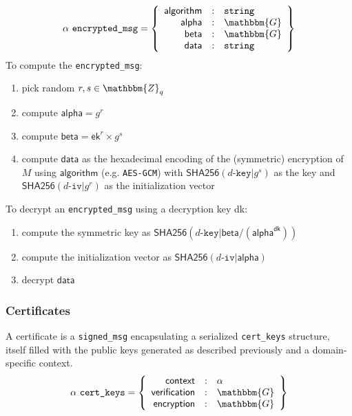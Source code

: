 \documentclass[a4paper]{article}
\newcommand{\G}{\mathbbm{G}}
\newcommand{\Z}{\mathbbm{Z}}
\newcommand{\jstring}{\texttt{string}}
\begin{document}
\begin{gather*}
  \alpha\ \texttt{encrypted\_msg}=\left\{
    \begin{array}{rcl}
      \textsf{algorithm}&:&\jstring\\
      \textsf{alpha}&:&\G\\
      \textsf{beta}&:&\G\\
      \textsf{data}&:&\jstring
    \end{array}
  \right\}
\end{gather*}
To compute the \texttt{encrypted\_msg}:
\begin{enumerate}
\item pick random $r,s\in\Z_q$
\item compute $\textsf{alpha}=g^r$
\item compute $\textsf{beta}=\textsf{ek}^r\times g^s$
\item compute $\textsf{data}$ as the hexadecimal encoding of the
  (symmetric) encryption of $M$ using $\textsf{algorithm}$
  (e.g. \texttt{AES-GCM}) with
  $\textsf{SHA256}(d\texttt{-key|}g^s)$ as the key and
  $\textsf{SHA256}(d\texttt{-iv|}g^r)$ as the initialization vector
\end{enumerate}
To decrypt an \texttt{encrypted\_msg} using a decryption key \textsf{dk}:
\begin{enumerate}
\item compute the symmetric key as $\textsf{SHA256}(d\texttt{-key|}\textsf{beta}/(\textsf{alpha}^{\textsf{dk}}))$
\item compute the initialization vector as $\textsf{SHA256}(d\texttt{-iv|}\textsf{alpha})$
\item decrypt $\textsf{data}$
\end{enumerate}

\subsubsection{Certificates}
\label{certificates}

A certificate is a \texttt{signed\_msg} encapsulating a serialized
\texttt{cert\_keys} structure, itself filled with the public keys
generated as described previously and a domain-specific context.
\begin{gather*}
  \alpha\ \texttt{cert\_keys}=\left\{
    \begin{array}{rcl}
      \textsf{context}&:&\alpha\\
      \textsf{verification}&:&\G\\
      \textsf{encryption}&:&\G
    \end{array}
  \right\}
\end{gather*}
\end{document}
